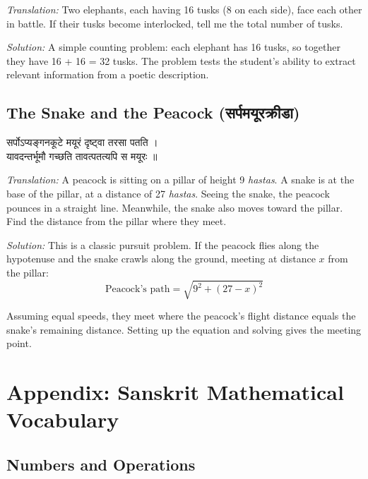 \documentclass[10pt,a4paper]{article}
\newenvironment{sanskritverse}{%
  \begin{center}%
  \begin{minipage}{0.94\textwidth}%
  \centering\devanagarifont\small%
}{%
  \end{minipage}%
  \end{center}%
  \vspace{0.1em}%
}
\begin{document}
\textit{Translation:} Two elephants, each having 16 tusks (8 on each side), face each other in battle. If their tusks become interlocked, tell me the total number of tusks.

\textit{Solution:} A simple counting problem: each elephant has 16 tusks, so together they have 16 + 16 = 32 tusks. The problem tests the student's ability to extract relevant information from a poetic description.

\subsection*{The Snake and the Peacock (सर्पमयूरक्रीडा)}

\begin{sanskritverse}
सर्पोऽप्यङ्गनकूटे मयूरं दृष्ट्वा तरसा पतति ।\\
यावदन्तर्भूमौ गच्छति तावत्पतत्यपि स मयूरः ॥
\end{sanskritverse}

\textit{Translation:} A peacock is sitting on a pillar of height 9 \textit{hastas}. A snake is at the base of the pillar, at a distance of 27 \textit{hastas}. Seeing the snake, the peacock pounces in a straight line. Meanwhile, the snake also moves toward the pillar. Find the distance from the pillar where they meet.

\textit{Solution:} This is a classic pursuit problem. If the peacock flies along the hypotenuse and the snake crawls along the ground, meeting at distance $x$ from the pillar:
\[
\text{Peacock's path} = \sqrt{9^2 + (27-x)^2}
\]

Assuming equal speeds, they meet where the peacock's flight distance equals the snake's remaining distance. Setting up the equation and solving gives the meeting point.

\section*{Appendix: Sanskrit Mathematical Vocabulary}

\subsection*{Numbers and Operations}
\end{document}
